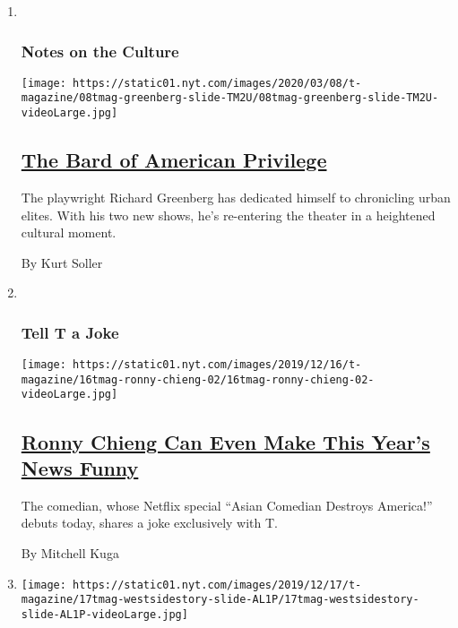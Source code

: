 \begin{enumerate}
\def\labelenumi{\arabic{enumi}.}
\item ~
  \hypertarget{notes-on-the-culture}{%
  \subsubsection{Notes on the Culture}\label{notes-on-the-culture}}

  \texttt{[image: https://static01.nyt.com/images/2020/03/08/t-magazine/08tmag-greenberg-slide-TM2U/08tmag-greenberg-slide-TM2U-videoLarge.jpg]}

  \hypertarget{the-bard-of-american-privilege}{%
  \subsection{\texorpdfstring{\href{/2020/03/03/t-magazine/richard-greenberg-playwright.html}{The
  Bard of American
  Privilege}}{The Bard of American Privilege}}\label{the-bard-of-american-privilege}}

  The playwright Richard Greenberg has dedicated himself to chronicling
  urban elites. With his two new shows, he's re-entering the theater in
  a heightened cultural moment.

  By Kurt Soller
\item ~
  \hypertarget{tell-t-a-joke}{%
  \subsubsection{Tell T a Joke}\label{tell-t-a-joke}}

  \texttt{[image: https://static01.nyt.com/images/2019/12/16/t-magazine/16tmag-ronny-chieng-02/16tmag-ronny-chieng-02-videoLarge.jpg]}

  \hypertarget{ronny-chieng-can-even-make-this-years-news-funny}{%
  \subsection{\texorpdfstring{\href{/2019/12/17/t-magazine/ronny-chieng.html}{Ronny
  Chieng Can Even Make This Year's News
  Funny}}{Ronny Chieng Can Even Make This Year's News Funny}}\label{ronny-chieng-can-even-make-this-years-news-funny}}

  The comedian, whose Netflix special ``Asian Comedian Destroys
  America!'' debuts today, shares a joke exclusively with T.

  By Mitchell Kuga
\item
  \texttt{[image: https://static01.nyt.com/images/2019/12/17/t-magazine/17tmag-westsidestory-slide-AL1P/17tmag-westsidestory-slide-AL1P-videoLarge.jpg]}


\end{enumerate}
